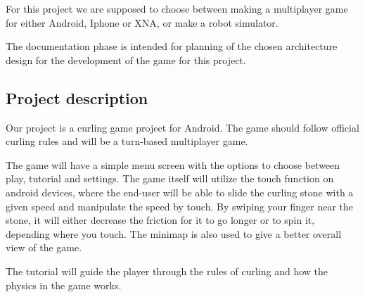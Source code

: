For this project we are supposed to choose between making a multiplayer game for either Android, Iphone or XNA, or make a robot simulator. 

The documentation phase is intended for planning of the chosen architecture design for the development of the game for this project.

\subsection{Project description} 
Our project is a curling game project for Android. The game should follow official curling rules and will be a turn-based multiplayer game.

The game will have a simple menu screen with the options to choose between play, tutorial and settings. The game itself will utilize the touch function on android devices, where the end-user will be able to slide the curling stone with a given speed and manipulate the speed by touch. By swiping your finger near the stone, it will either decrease the friction for it to go longer or to spin it, depending where you touch. The minimap is also used to give a better overall view of the game.

The tutorial will guide the player through the rules of curling and how the physics in the game works.
